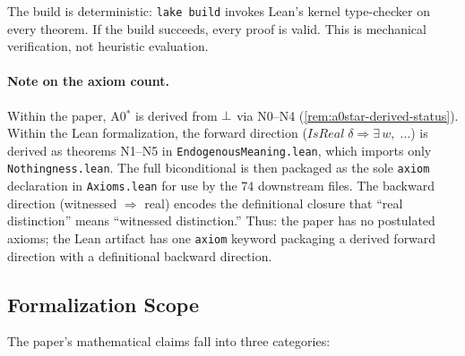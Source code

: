 \noindent
The build is deterministic: \texttt{lake build} invokes Lean's kernel
type-checker on every theorem.  If the build succeeds, every proof is
valid.  This is mechanical verification, not heuristic evaluation.

\paragraph{Note on the axiom count.}
Within the paper, A0$^*$ is derived from $\bot$ via N0--N4
(\cref{rem:a0star-derived-status}).  Within the Lean formalization,
the forward direction ($\mathit{IsReal}\;\delta \Rightarrow
\exists\, w,\;\ldots$) is derived as theorems N1--N5 in
\texttt{EndogenousMeaning.lean}, which imports only
\texttt{Nothingness.lean}.  The full biconditional is then packaged
as the sole \texttt{axiom} declaration in \texttt{Axioms.lean} for
use by the 74 downstream files.  The backward direction (witnessed
$\Rightarrow$ real) encodes the definitional closure that ``real
distinction'' means ``witnessed distinction.''  Thus: the paper has
no postulated axioms; the Lean artifact has one \texttt{axiom}
keyword packaging a derived forward direction with a definitional
backward direction.

\subsection{Formalization Scope}

The paper's mathematical claims fall into three categories:

